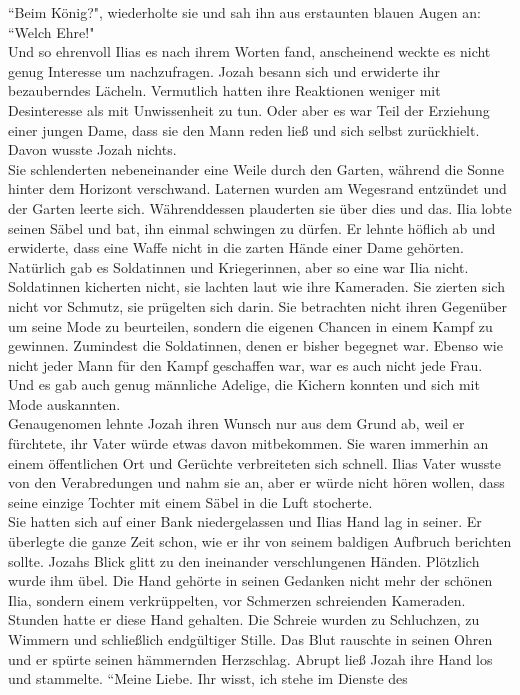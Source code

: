  ``Beim König?", wiederholte sie und sah ihn aus erstaunten blauen Augen an:  ``Welch Ehre!"\\
Und so ehrenvoll Ilias es nach ihrem Worten fand, anscheinend weckte es nicht genug Interesse um 
nachzufragen. Jozah besann sich und erwiderte ihr bezauberndes Lächeln. Vermutlich hatten ihre 
Reaktionen weniger mit Desinteresse als mit Unwissenheit zu tun. Oder aber es war Teil der 
Erziehung einer jungen Dame, dass sie den Mann reden ließ und sich selbst zurückhielt. Davon wusste 
Jozah nichts. \\
Sie schlenderten nebeneinander eine Weile durch den Garten, während die Sonne hinter dem Horizont 
verschwand. Laternen wurden am Wegesrand entzündet und der Garten leerte sich. Währenddessen 
plauderten sie über dies und das. Ilia lobte seinen Säbel und bat, ihn einmal schwingen zu dürfen. 
Er lehnte höflich ab und erwiderte, dass eine Waffe nicht in die zarten Hände einer Dame gehörten.
Natürlich gab es Soldatinnen und Kriegerinnen, aber so eine war Ilia nicht. Soldatinnen kicherten 
nicht, sie lachten laut wie ihre Kameraden. Sie zierten sich nicht vor Schmutz, sie prügelten sich 
darin. Sie betrachten nicht ihren Gegenüber um seine Mode zu beurteilen, sondern die eigenen 
Chancen in einem Kampf zu gewinnen. Zumindest die Soldatinnen, denen er bisher begegnet war. Ebenso 
wie nicht jeder Mann für den Kampf geschaffen war, war es auch nicht jede Frau. Und es gab auch 
genug männliche Adelige, die Kichern konnten und sich mit Mode auskannten. \\
Genaugenomen lehnte Jozah ihren Wunsch nur aus dem Grund ab, weil er fürchtete, ihr Vater würde 
etwas davon mitbekommen. Sie waren immerhin an einem öffentlichen Ort und Gerüchte verbreiteten 
sich schnell. Ilias Vater wusste von den Verabredungen und nahm sie an, aber er würde nicht hören 
wollen, dass seine einzige Tochter mit einem Säbel in die Luft stocherte.\\
Sie hatten sich auf einer Bank niedergelassen und Ilias Hand lag in seiner. Er überlegte die ganze 
Zeit schon, wie er ihr von seinem baldigen Aufbruch berichten sollte. Jozahs Blick glitt zu den 
ineinander verschlungenen Händen.  Plötzlich wurde ihm übel. Die Hand gehörte in seinen Gedanken 
nicht mehr der schönen Ilia, sondern einem verkrüppelten, vor Schmerzen schreienden Kameraden. 
Stunden hatte er diese Hand gehalten. Die Schreie wurden zu Schluchzen, zu Wimmern und schließlich 
endgültiger Stille. Das Blut rauschte in seinen Ohren und er spürte seinen hämmernden Herzschlag. 
Abrupt ließ Jozah ihre Hand los und stammelte.  ``Meine Liebe. Ihr wisst, ich stehe im Dienste des 
